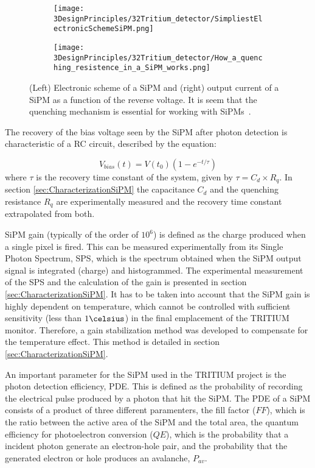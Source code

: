 \begin{figure}
\centering
    \begin{subfigure}[b]{0.45\textwidth}
    \centering
    \texttt{[image: 3DesignPrinciples/32Tritium\_detector/SimpliestElectronicSchemeSiPM.png]}  
    \caption{\label{subfig:ElectricModelSiPM}}
    \end{subfigure}
    \hfill
    \begin{subfigure}[b]{0.45\textwidth}
    \centering
    \texttt{[image: 3DesignPrinciples/32Tritium\_detector/How\_a\_quenching\_resistence\_in\_a\_SiPM\_works.png]}  
    \caption{\label{subfig:HowSiPMworks}}
    \end{subfigure}
 \caption{(Left) Electronic scheme of a SiPM and (right) output current of a SiPM as a function of the reverse voltage. It is seem that the quenching mechanism is essential for working with SiPMs~\cite{DataSheetSensL}.}
 \label{fig:ChenchingResistance}
\end{figure}

The recovery of the bias voltage seen by the SiPM after photon detection is characteristic of a RC circuit, described by the equation: 

\begin{equation}
V_{bias}(t)=V(t_0)\left(1-e^{-t/\tau} \right)
\label{RCCircuitBiasVoltage}
\end{equation}
where $\tau$ is the recovery time constant of the system, given by $\tau=C_d \times R_q$. In section \ref{sec:CharacterizationSiPM} the capacitance $C_d$ and the quenching resistance $R_q$ are experimentally measured and the recovery time constant extrapolated from both.

SiPM gain (typically of the order of $10^6$) is defined as the charge produced when a single pixel is fired. This can be measured experimentally from its Single Photon Spectrum, SPS, which is the spectrum obtained when the SiPM output signal is integrated (charge) and histogrammed. The experimental measurement of the SPS and the calculation of the gain is presented in section \ref{sec:CharacterizationSiPM}. It has to be taken into account that the SiPM gain is highly dependent on temperature, which cannot be controlled with sufficient sensitivity (less than $1\celsius$) in the final emplacement of the TRITIUM monitor. Therefore, a gain stabilization method was developed to compensate for the temperature effect. This method is detailed in section \ref{sec:CharacterizationSiPM}.

An important parameter for the SiPM used in the TRITIUM project is the photon detection efficiency, PDE. This is defined as the probability of recording the electrical pulse produced by a photon that hit the SiPM. The PDE of a SiPM consists of a product of three different paramenters, the fill factor ($FF$), which is the ratio between the active area of the SiPM and the total area, the quantum efficiency for photoelectron conversion ($QE$), which is the probability that a incident photon generate an electron-hole pair, and the probability that the generated electron or hole produces an avalanche, $P_{av}$.

